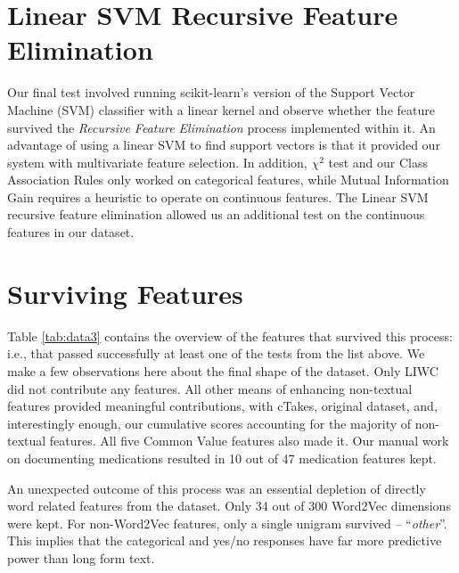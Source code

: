 \section{Linear SVM Recursive Feature Elimination}
Our final test involved running \textsf{scikit-learn}'s version
of the Support Vector Machine (SVM) classifier with
a linear kernel \cite{cortes95} and observe whether the feature survived the
\textit{Recursive Feature Elimination} process implemented
within it. An advantage of using a linear SVM to find support vectors is that 
it provided our system with multivariate feature selection.
In addition, $\chi^2$ test and our Class Association Rules only worked on categorical features, 
while Mutual Information Gain requires a heuristic \cite{Xu07} to operate on continuous features.
The Linear SVM recursive feature elimination allowed us an additional test on
the continuous features in our dataset.

\section{Surviving Features}

Table \ref{tab:data3} contains the overview of the features that
survived this process: i.e., that passed successfully at least one of
the tests from the list above. We make a few observations here
about the final shape of the dataset. Only \textsf{LIWC} did
not contribute any features. All other means of enhancing
non-textual features provided meaningful contributions, 
with \textsf{cTakes}, original dataset, and, interestingly
enough, our cumulative scores accounting for the
majority of non-textual features.  All five \textsf{Common Value}
features also made it. Our manual work on documenting
medications resulted in 10 out of 47 medication
features kept. 

An unexpected outcome of 
this process was an essential depletion of directly word related
features from the dataset. Only 34 out of 300 Word2Vec dimensions were kept. For non-Word2Vec features, only a single unigram survived -- ``\textit{other}''. 
This implies that the categorical and yes/no responses have far more predictive power  than long form text.

